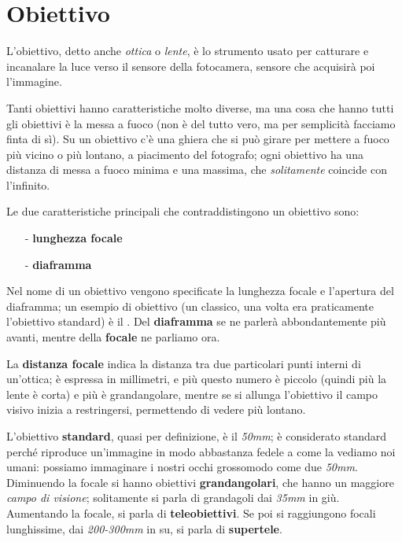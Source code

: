 \section{Obiettivo} \label{sec:obiettivo}

L'obiettivo, detto anche \textit{ottica} o \textit{lente}, è lo strumento usato per catturare e incanalare la
luce verso il sensore della fotocamera, sensore che acquisirà poi l'immagine.

Tanti obiettivi hanno caratteristiche molto diverse, ma una cosa che hanno tutti gli
obiettivi è la messa a fuoco (non è del tutto vero, ma per semplicità facciamo finta di sì).
Su un obiettivo c'è una ghiera che si può girare per mettere a fuoco più vicino o più
lontano, a piacimento del fotografo; ogni obiettivo ha una distanza di messa a fuoco
minima e una massima, che \textit{solitamente} coincide con l'infinito.

Le due caratteristiche principali che contraddistingono un obiettivo sono:
\begin{itemize}
    \item[-] \textbf{lunghezza focale}
    \item[-] \textbf{diaframma} 
\end{itemize}

Nel nome di un obiettivo vengono specificate la lunghezza focale e l'apertura del diaframma; un esempio di obiettivo (un classico, una volta era praticamente l'obiettivo standard) è il .\newline
Del \textbf{diaframma} se ne parlerà abbondantemente più avanti, mentre della \textbf{focale} ne parliamo ora.

La \textbf{distanza focale} indica la distanza tra due particolari punti interni di un'ottica; è
espressa in millimetri, e più questo numero è piccolo (quindi più la lente è corta) e più è
grandangolare, mentre se si allunga l'obiettivo il campo visivo inizia a restringersi,
permettendo di vedere più lontano.

L'obiettivo \textbf{standard}, quasi per definizione, è il \textit{50mm}; è considerato standard perché riproduce un'immagine in modo abbastanza fedele a come la vediamo noi umani:
possiamo immaginare i nostri occhi grossomodo come due \textit{50mm}.\newline
Diminuendo la focale si hanno obiettivi \textbf{grandangolari}, che hanno un maggiore \textit{campo di visione}; solitamente si parla di grandagoli dai \textit{35mm} in giù.\newline
Aumentando la focale, si parla di \textbf{teleobiettivi}. Se poi si raggiungono focali lunghissime, dai \textit{200-300mm} in su, si parla di \textbf{supertele}.

